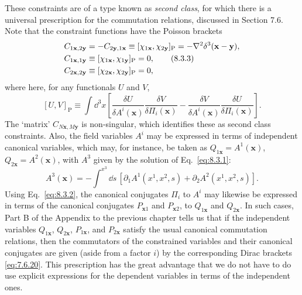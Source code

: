 These constraints are of a type known as \textit{second class}, for which
there is a universal prescription for the commutation relations, discussed
in Section 7.6. Note that the constraint functions have the Poisson brackets
\begin{align}
  C_{1\mathbf x,2\mathbf y}
  &=-C_{2\mathbf y,1\mathbf x}
  \equiv[\chi_{1\mathbf x},\chi_{2\mathbf y}]_{\mathrm P}
  =-\nabla^2\delta^3(\mathbf x-\mathbf y),
  \notag\\
  C_{1\mathbf x,1\mathbf y}
  &\equiv[\chi_{1\mathbf x},\chi_{1\mathbf y}]_{\mathrm P}=0,
  \tag{8.3.3}\label{eq:8.3.3}\\
  C_{2\mathbf x,2\mathbf y}
  &\equiv[\chi_{2\mathbf x},\chi_{2\mathbf y}]_{\mathrm P}=0,
  \notag
\end{align}
where here, for any functionals $U$ and $V$,
\[
  [U,V]_{\mathrm P}\equiv\int \dd^3x\left[
  \frac{\delta U}{\delta A^i(\mathbf x)}
  \frac{\delta V}{\delta\Pi_i(\mathbf x)}
  -\frac{\delta V}{\delta A^i(\mathbf x)}
  \frac{\delta U}{\delta\Pi_i(\mathbf x)}\right].
\]
The `matrix' $C_{N\mathbf x,M\mathbf y}$ is non-singular, which identifies
these as second class constraints. Also, the field variables $A^i$ may be
expressed in terms of independent canonical variables, which may, for
instance, be taken as $Q_{1\mathbf x}=A^1(\mathbf x)$,
$Q_{2\mathbf x}=A^2(\mathbf x)$, with $A^3$ given by the solution of
Eq.~\eqref{eq:8.3.1}:
\[
  A^3(\mathbf x)=-\int^{x^3}\dd s\,
  [\partial_1A^1(x^1,x^2,s)+\partial_2A^2(x^1,x^2,s)].
\]
Using Eq.~\eqref{eq:8.3.2}, the canonical conjugates $\Pi_i$ to $A^i$ may likewise be
expressed in terms of the canonical conjugates $P_{\mathbf x1}$ and
$P_{\mathbf x2}$, to $Q_{1\mathbf x}$ and $Q_{2\mathbf x}$. In such cases,
Part B of the Appendix to the previous chapter tells us that if the
independent variables $Q_{1\mathbf x}$, $Q_{2\mathbf x}$,
$P_{1\mathbf x}$, and $P_{2\mathbf x}$ satisfy the usual canonical
commutation relations, then the commutators of the constrained variables
and their canonical conjugates are given (aside from a factor $i$) by the
corresponding Dirac brackets \eqref{eq:7.6.20}. This prescription has the great
advantage that we do not have to do use explicit expressions for the dependent
variables in terms of the independent ones.

